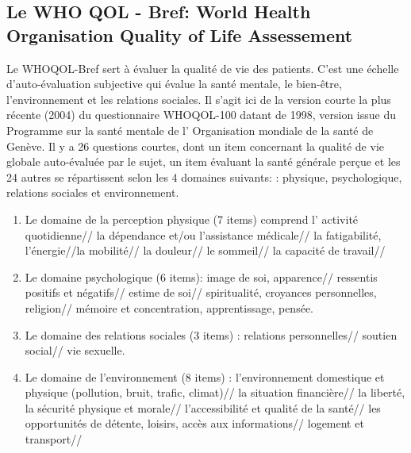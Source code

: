  \subsection{Le WHO QOL - Bref:  World Health
   Organisation Quality of Life Assessement }
 
Le  WHOQOL-Bref sert à évaluer la qualité de vie des patients. C'est une échelle
d'auto-évaluation subjective qui évalue la santé mentale, le
bien-être, l'environnement et les relations sociales.
Il s'agit ici de la version courte  la plus récente (2004) du questionnaire
 WHOQOL-100 datant de 1998, version issue du Programme sur la santé
 mentale de l'
Organisation mondiale de la santé de Genève. Il y a 26 questions
courtes, dont un item concernant la qualité de vie globale
auto-évaluée par le sujet, un item évaluant la santé générale perçue
et les 24 autres se répartissent selon les 4 domaines suivants:  
: physique, psychologique, relations sociales et environnement.
\begin{enumerate}
	\item  Le domaine de la perception physique (7 items) comprend l' activité quotidienne// la dépendance et/ou l'assistance médicale// la fatigabilité, l'énergie//la mobilité// la douleur// le sommeil// la capacité de travail//
	
		 \item Le domaine psychologique (6 items):  image de soi, apparence// ressentis positifs et négatifs// estime de soi// spiritualité, croyances personnelles, religion// mémoire et concentration, apprentissage, pensée.
		
			\item Le domaine des relations sociales (3 items) : relations personnelles// soutien social// vie sexuelle.
			
			\item Le domaine de l'environnement (8 items) :
                          l'environnement domestique et physique
                          (pollution, bruit, trafic, climat)// la
                          situation financière//  la liberté, la
                          sécurité physique et morale//
                          l'accessibilité et qualité de la santé// les
                          opportunités de détente, loisirs, accès aux
                          informations// logement et transport// 
		\end{enumerate}
		
	

